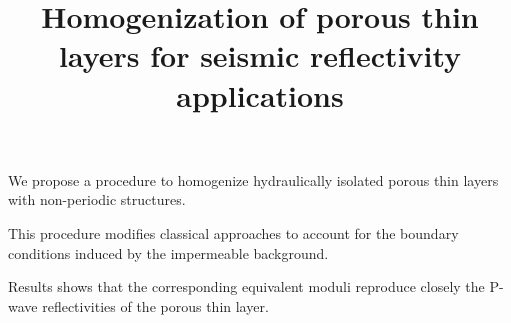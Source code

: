 \documentclass[draft]{agujournal2019}
\begin{document}

\title{Homogenization of porous thin layers for seismic reflectivity applications}
%
%






\begin{keypoints}
\item We propose a procedure to homogenize hydraulically isolated porous thin layers with non-periodic structures.
\item This procedure modifies classical approaches to account for the boundary conditions induced by the impermeable background.
\item Results shows that the corresponding equivalent moduli reproduce closely the P-wave reflectivities of the porous thin layer.

\end{keypoints}

\end{document}
